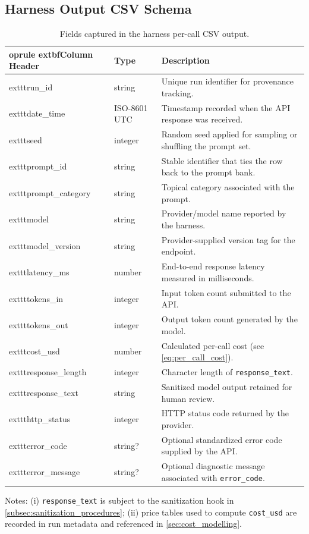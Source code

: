 \subsection{Harness Output CSV Schema}\label{app:csv_schema}

\begin{table}[h!]
\centering
\caption{Fields captured in the harness per-call CSV output.
\label{tab:csv_schema}}
\begin{tabularx}{\textwidth}{@{}l l X@{}}
	oprule
	extbf{Column Header} & \textbf{Type} & \textbf{Description} \\ \midrule
	exttt{run\_id} & string & Unique run identifier for provenance tracking. \\
	exttt{date\_time} & ISO-8601 UTC & Timestamp recorded when the API response was received. \\
	exttt{seed} & integer & Random seed applied for sampling or shuffling the prompt set. \\
	exttt{prompt\_id} & string & Stable identifier that ties the row back to the prompt bank. \\
	exttt{prompt\_category} & string & Topical category associated with the prompt. \\
	exttt{model} & string & Provider/model name reported by the harness. \\
	exttt{model\_version} & string & Provider-supplied version tag for the endpoint. \\
	exttt{latency\_ms} & number & End-to-end response latency measured in milliseconds. \\
	exttt{tokens\_in} & integer & Input token count submitted to the API. \\
	exttt{tokens\_out} & integer & Output token count generated by the model. \\
	exttt{cost\_usd} & number & Calculated per-call cost (see \cref{eq:per_call_cost}). \\
	exttt{response\_length} & integer & Character length of \texttt{response\_text}. \\
	exttt{response\_text} & string & Sanitized model output retained for human review. \\
	exttt{http\_status} & integer & HTTP status code returned by the provider. \\
	exttt{error\_code} & string? & Optional standardized error code supplied by the API. \\
	exttt{error\_message} & string? & Optional diagnostic message associated with \texttt{error\_code}. \\
\bottomrule
\end{tabularx}
\end{table}

Notes: (i) \texttt{response\_text} is subject to the sanitization hook in \cref{subsec:sanitization_procedures}; (ii) price tables used to compute \texttt{cost\_usd} are recorded in run metadata and referenced in \cref{sec:cost_modelling}.

